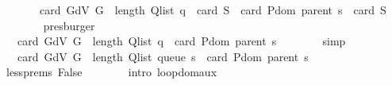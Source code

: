 \begin{isabellebody}
\ \ \ \ \ \ \ card\ {\isacharparenleft}{\kern0pt}G{\isachardot}{\kern0pt}dV\ G{\isacharparenright}{\kern0pt}\ {\isacharplus}{\kern0pt}\ length\ {\isacharparenleft}{\kern0pt}Q{\isacharunderscore}{\kern0pt}list\ {\isacharquery}{\kern0pt}q{\isacharparenright}{\kern0pt}\ {\isacharplus}{\kern0pt}\ card\ {\isacharquery}{\kern0pt}S\ {\isacharminus}{\kern0pt}\ {\isacharparenleft}{\kern0pt}card\ {\isacharparenleft}{\kern0pt}P{\isachardot}{\kern0pt}dom\ {\isacharparenleft}{\kern0pt}parent\ s{\isacharparenright}{\kern0pt}{\isacharparenright}{\kern0pt}\ {\isacharplus}{\kern0pt}\ card\ {\isacharquery}{\kern0pt}S{\isacharparenright}{\kern0pt}{\isachardoublequoteclose}\isanewline
\ \ \ \ \ \ \isamarkupfalse%
\ presburger\isanewline
\ \ \ \ \isamarkupfalse%
\ \isamarkupfalse%
\ {\isachardoublequoteopen}{\isachardot}{\kern0pt}{\isachardot}{\kern0pt}{\isachardot}{\kern0pt}\ {\isacharequal}{\kern0pt}\ card\ {\isacharparenleft}{\kern0pt}G{\isachardot}{\kern0pt}dV\ G{\isacharparenright}{\kern0pt}\ {\isacharplus}{\kern0pt}\ length\ {\isacharparenleft}{\kern0pt}Q{\isacharunderscore}{\kern0pt}list\ {\isacharquery}{\kern0pt}q{\isacharparenright}{\kern0pt}\ {\isacharminus}{\kern0pt}\ card\ {\isacharparenleft}{\kern0pt}P{\isachardot}{\kern0pt}dom\ {\isacharparenleft}{\kern0pt}parent\ s{\isacharparenright}{\kern0pt}{\isacharparenright}{\kern0pt}{\isachardoublequoteclose}\isanewline
\ \ \ \ \ \ \isamarkupfalse%
\ simp\isanewline
\ \ \ \ \isamarkupfalse%
\ \isamarkupfalse%
\ {\isachardoublequoteopen}{\isachardot}{\kern0pt}{\isachardot}{\kern0pt}{\isachardot}{\kern0pt}\ {\isacharless}{\kern0pt}\ card\ {\isacharparenleft}{\kern0pt}G{\isachardot}{\kern0pt}dV\ G{\isacharparenright}{\kern0pt}\ {\isacharplus}{\kern0pt}\ length\ {\isacharparenleft}{\kern0pt}Q{\isacharunderscore}{\kern0pt}list\ {\isacharparenleft}{\kern0pt}queue\ s{\isacharparenright}{\kern0pt}{\isacharparenright}{\kern0pt}\ {\isacharminus}{\kern0pt}\ card\ {\isacharparenleft}{\kern0pt}P{\isachardot}{\kern0pt}dom\ {\isacharparenleft}{\kern0pt}parent\ s{\isacharparenright}{\kern0pt}{\isacharparenright}{\kern0pt}{\isachardoublequoteclose}\isanewline
\ \ \ \ \ \ \isamarkupfalse%
\ less{\isachardot}{\kern0pt}prems\ False\isanewline
\ \ \ \ \ \ \isamarkupfalse%
\ {\isacharparenleft}{\kern0pt}intro\ loop{\isacharunderscore}{\kern0pt}dom{\isacharunderscore}{\kern0pt}aux{\isacharunderscore}{\kern0pt}{}{\isacharparenright}{\kern0pt}\isanewline
\ \ \ \ \isamarkupfalse%
\ \isamarkupfalse%

\end{isabellebody}
